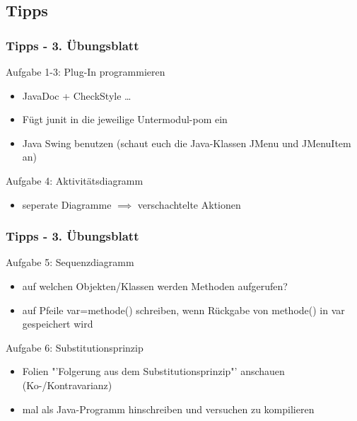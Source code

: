 \documentclass[18pt]{beamer}
\begin{document}
	\subsection{Tipps}
	\begin{frame}
		\frametitle{Tipps - 3. Übungsblatt}
			\begin{exampleblock}{Aufgabe 1-3: Plug-In programmieren}
				\begin{itemize}
					\pause
					\item JavaDoc + CheckStyle \dots
					\item Fügt junit in die jeweilige Untermodul-pom ein
					\item Java Swing benutzen (schaut euch die Java-Klassen JMenu und JMenuItem an)
				\end{itemize}
			\end{exampleblock}
			\pause
			\begin{exampleblock}{Aufgabe 4: Aktivitätsdiagramm}
				\begin{itemize}
					\pause 
					\item seperate Diagramme $\implies$ verschachtelte Aktionen
				\end{itemize}
			\end{exampleblock}
	\end{frame}

	\begin{frame}
		\frametitle{Tipps - 3. Übungsblatt}
			\begin{exampleblock}{Aufgabe 5: Sequenzdiagramm}
				\begin{itemize}
					\pause
					\item auf welchen Objekten/Klassen werden Methoden aufgerufen?
					\item auf Pfeile var=methode() schreiben, wenn Rückgabe von methode() in var gespeichert wird
				\end{itemize}
			\end{exampleblock}
			\pause
			\begin{exampleblock}{Aufgabe 6: Substitutionsprinzip}
				\begin{itemize}
					\pause
					\item Folien "'Folgerung aus dem Substitutionsprinzip"' anschauen (Ko-/Kontravarianz)
					\item mal als Java-Programm hinschreiben und versuchen zu kompilieren
				\end{itemize}
			\end{exampleblock}
	\end{frame}
	
\end{document}
